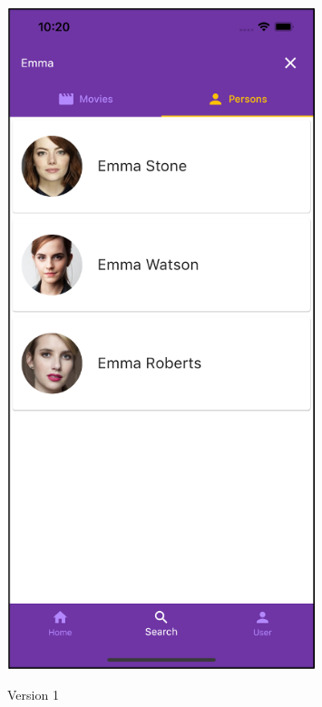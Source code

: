 \documentclass[12pt, a4paper]{article}
\numberwithin{figure}{section}
\begin{document}
\begin{center}
	\begin{minipage}{0.3\textwidth}
		\begin{figure}[H]
			\centering
			\includegraphics[width=0.8\textwidth]{images/experiment/searchTab.png}\\
			\caption{Version 1}
			\label{fig:version1}
		\end{figure}
	\end{minipage}
	\hspace{0.1\linewidth}
	\begin{minipage}{0.3\textwidth}

\end{minipage}
\end{center}
\end{document}
